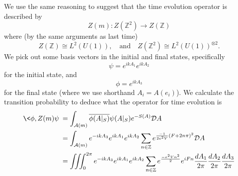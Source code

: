 We use the same reasoning to suggest that the time evolution
operator is described by
\begin{equation}%
Z(m):Z(\mathbb{Z}^{2})\to Z(\mathbb{Z})
\end{equation}
where (by the same arguments as last time)
\begin{equation}%
Z(\mathbb{Z})\cong L^{2}(U(1)),\quad\text{and}\quad
Z(\mathbb{Z}^{2})\cong L^{2}(U(1))^{\otimes 2}.
\end{equation}
We pick out some basis vectors in the initial and final states,
specifically
\begin{equation}%
\psi = e^{ikA_{1}}e^{ikA_{2}}
\end{equation}
for the initial state, and
\begin{equation}%
\phi = e^{ikA_{3}}
\end{equation}
for the final state (where we use shorthand $A_{i}=A(e_{i})$). We
calculate the transition probability to deduce what the operator
for time evolution is
\begin{subequations}
\begin{align}
\<\phi,Z(m)\psi\> &= \int_{\mathcal{A}(m)}\overline{\phi(A|_{S})}\psi(A|_{S})e^{-S(A)}\mathcal{D}A\\
&= \int_{\mathcal{A}(m)}
e^{-ikA_{3}}e^{ikA_{1}}e^{ikA_{2}}\sum_{n\in\mathbb{Z}}e^{\frac{-1}{2e^{2}V}(F+2n\pi)^{2}}\mathcal{D}A\\
&= \iiint^{2\pi}_{0}
e^{-ikA_{3}}e^{ikA_{1}}e^{ikA_{2}}\sum_{n\in\mathbb{Z}}e^{\frac{-e^{2}Vn^{2}}{2}}e^{iFn} \frac{dA_{1}}{2\pi}\frac{dA_{2}}{2\pi}\frac{dA_{3}}{2\pi}
\end{align}
\end{subequations}
